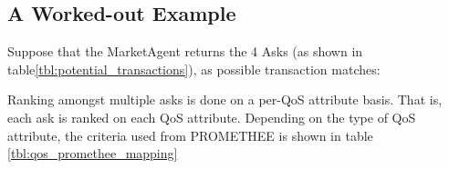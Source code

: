 \documentclass[10pt,journal,compsoc]{IEEEtran}
\begin{document}
\subsection{A Worked-out Example}
Suppose that the MarketAgent returns the 4 Asks (as shown in table\ref{tbl:potential_transactions}), as possible transaction matches:
\begin{table}
\centering
{}
\qquad
{}
\qquad 
{}
\qquad
{}
\caption{Asks returned by MarketAgent as potential transactions \label{tbl:potential_transactions}}
\end{table}

Ranking amongst multiple asks is done on a per-QoS attribute basis. That is, each ask is ranked on each QoS attribute. Depending on the type of QoS attribute, the criteria used from PROMETHEE is shown in table \ref{tbl:qos_promethee_mapping}
\end{document}
